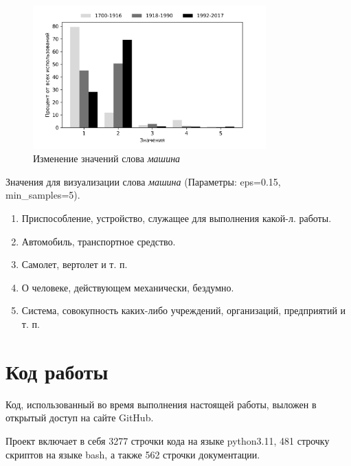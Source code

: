 \documentclass[LI,VKR]{HSEUniversity}
\begin{document}
\begin{figure}[H]
	\centering
	\includegraphics[width=0.8\textwidth]{img/visualizations/mashina_minimal}
	\caption{Изменение значений слова \textit{машина}}
	\label{fig:Машина_example}
\end{figure}

Значения для визуализации слова \textit{машина} (Параметры: eps=0.15, min\_samples=5).

\begin{enumerate}
    \item Приспособление, устройство, служащее для выполнения какой-л. работы.
    \item Автомобиль, транспортное средство.
    \item Самолет, вертолет и т. п.
    \item О человеке, действующем механически, бездумно.
    \item Система, совокупность каких-либо учреждений, организаций, предприятий и т. п.
\end{enumerate}


\section{Код работы}

Код, использованный во время выполнения настоящей работы, выложен в открытый доступ
на сайте GitHub.~

Проект включает в себя 3277 строчки кода на языке python3.11, %
481 строчку скриптов на языке bash,
а также 562 строчки документации. %
\end{document}
